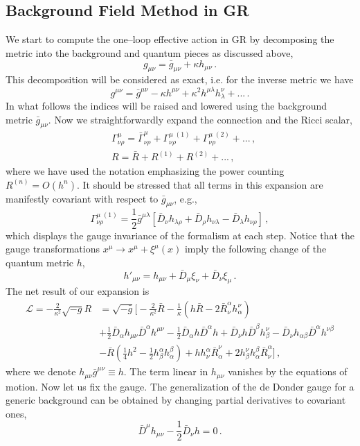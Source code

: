\documentclass[11pt,a4paper]{article}
\newcommand{\be}{\begin{equation}}
\newcommand{\ee}{\end{equation}}
\newcommand\m{\mu}
\newcommand\G{\Gamma}
\newcommand\n{\nu}
\renewcommand\r{\rho}
\renewcommand\a{\alpha}
\renewcommand\b{\beta}
\renewcommand\l{\lambda}
\begin{document}
\subsection{Background Field Method in GR}

We start to compute the one--loop effective action in GR by
decomposing the metric into the background and quantum pieces as discussed above,
\be
g_{\m \n}=\bar g_{\m \n} +\kappa h_{\m \n}\,.
\ee
This decomposition will be considered as exact, i.e. for the inverse metric we have
\be
 g^{\m \n}=\bar g^{\m \n} -\kappa h^{\m \n}+\kappa^2 h^{\m\l}h_{\l}^\n+...\,.
\ee
In what follows the indices will be raised and lowered using the background metric $\bar g_{\m \n}$.
Now we straightforwardly expand the connection and the Ricci scalar,
\be
\begin{split}
& \G^\m_{\n \r}=\bar \G^\m_{\n \r}+\G^{\m\;(1)}_{\n \r}+\G^{\m\;(2)}_{\n \r}+...\,,\\
& R=\bar R+R^{(1)}+R^{(2)}+...\,,
\end{split}
\ee
where we have used the notation emphasizing the power counting $R^{(n)}=O( h^n)$.
It should be stressed that all terms in this expansion are manifestly covariant with respect to $\bar g_{\m \n}$,
e.g.,
\be
 \G^{\m\;(1)}_{\n \r}=\frac{1}{2}\bar g^{\m \l}[\bar D_{\n}h_{\l \r}+\bar D_{\r}h_{\n \l}-\bar D_{\l}h_{\n \r}]\,,
\ee
which displays the gauge invariance of the formalism at each step.
Notice that the gauge transformations $x^\m\to x^\m+\xi^\m(x)$
imply the following change of the quantum metric $h$,
\be
 h'_{\m \n}=h_{\m \n}+\bar D_\m\xi_\n+\bar D_\n\xi_\m\,.
\ee
The net result of our expansion is
\be
\label{eq:quadraticGR}
\begin{split}
\mathcal{L}=-\frac{2}{\kappa^2}\sqrt{-g}R&=\sqrt{-\bar g}\Big[
-\frac{2}{\kappa^2}\bar R-\frac{1}{\kappa}\left(h\bar R-2\bar R_{\n}^\a h_\a^\n \right)
\\
&+\frac{1}{2}\bar D_\a h_{\m \n} \bar D^\a h^{\m \n}-\frac{1}{2}\bar D_\a h \bar D^\a h
+\bar D_\n h \bar D^\b h^\n_\b-\bar D_\n h_{\a \b} \bar D^\a h^{\n \b}\\
&-\bar R\left(\frac{1}{4}h^2-\frac{1}{2}h^\a_\b h^\b_\a \right)
+h h^\a_\n \bar R^\n_\a + 2h^\n_\b h^\b_\a \bar R^\a_\n \Big]\,,
\end{split}
\ee
where we denote $h_{\m\n}\bar g^{\m\n}\equiv h$.
The term linear in $h_{\m\n}$ vanishes by the equations of motion.
Now let us fix the gauge. The generalization of the de Donder gauge for
a generic background can be obtained by changing partial derivatives to
covariant ones,
\be
\bar D^\mu h_{\m \n}-\frac{1}{2}\bar D_\n h=0\,.
\ee
\end{document}

